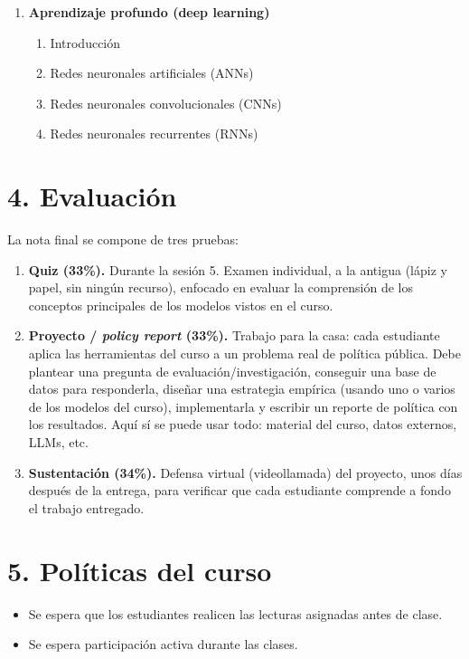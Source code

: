 \documentclass[11pt]{article}
\begin{document}
\begin{enumerate}[label=\Roman*., leftmargin=*, itemsep=4pt]
  \item \textbf{Aprendizaje profundo (deep learning)}
  \begin{enumerate}[label=\alph*.]
    \item Introducción
    \item Redes neuronales artificiales (ANNs)
    \item Redes neuronales convolucionales (CNNs)
    \item Redes neuronales recurrentes (RNNs)
  \end{enumerate}
\end{enumerate}

\section*{4. Evaluación}

La nota final se compone de tres pruebas:

\begin{enumerate}[leftmargin=*, itemsep=4pt]
  \item \textbf{Quiz (33\%).} Durante la sesión 5. Examen individual, a la antigua (lápiz y papel, sin ningún recurso), enfocado en evaluar la comprensión de los conceptos principales de los modelos vistos en el curso.
  \item \textbf{Proyecto / \textit{policy report} (33\%).} Trabajo para la casa: cada estudiante aplica las herramientas del curso a un problema real de política pública. Debe plantear una pregunta de evaluación/investigación, conseguir una base de datos para responderla, diseñar una estrategia empírica (usando uno o varios de los modelos del curso), implementarla y escribir un reporte de política con los resultados. Aquí sí se puede usar todo: material del curso, datos externos, LLMs, etc.
  \item \textbf{Sustentación (34\%).} Defensa virtual (videollamada) del proyecto, unos días después de la entrega, para verificar que cada estudiante comprende a fondo el trabajo entregado.
\end{enumerate}

\section*{5. Políticas del curso}

\begin{itemize}[leftmargin=*]
  \item Se espera que los estudiantes realicen las lecturas asignadas antes de clase.
  \item Se espera participación activa durante las clases.
\end{itemize}
\end{document}
